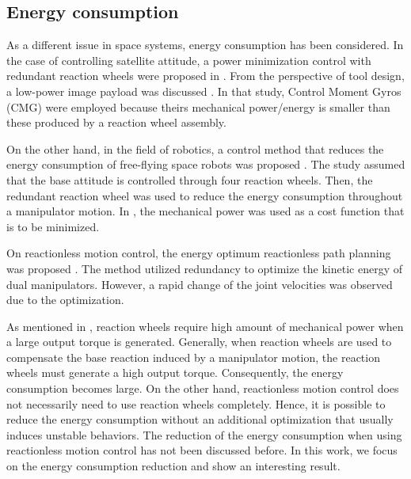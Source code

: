 \subsection{Energy consumption}
As a different issue in space systems,
energy consumption has been considered.
In the case of controlling satellite attitude,
a power minimization control with redundant reaction wheels were proposed in \cite{Schaub2009}.
From the perspective of tool design,
a low-power image payload was discussed \cite{Carpenter2008,Carpenter2009}.
In that study, Control Moment Gyros (CMG) were employed
because theirs mechanical power/energy is smaller than these produced by a reaction wheel assembly.

On the other hand,
in the field of robotics,
a control method that reduces the energy consumption of free-flying space robots
was proposed \cite{Nakamura1993}.
The study assumed that the base attitude is controlled through four reaction wheels.
Then, the redundant reaction wheel was used to reduce the energy consumption
throughout a manipulator motion.
In \cite{Lampariello2013},
the mechanical power was used as a cost function that is to be minimized.

On reactionless motion control,
the energy optimum reactionless path planning was proposed \cite{Shah20132}.
The method utilized redundancy to optimize the kinetic energy of dual manipulators.
However, a rapid change of the joint velocities was observed due to the optimization.

As mentioned in \cite{Carpenter2008},
reaction wheels require high amount of mechanical power when a large output torque is generated.
Generally, when reaction wheels are used to compensate
the base reaction induced by a manipulator motion,
the reaction wheels must generate a high output torque.
Consequently, the energy consumption becomes large.
On the other hand, reactionless motion control does not necessarily need to use reaction wheels completely.
Hence, it is possible to reduce the energy consumption without
an additional optimization that usually induces unstable behaviors.
The reduction of the energy consumption when using reactionless motion control
has not been discussed before.
In this work,
we focus on the energy consumption reduction and show an interesting result.


